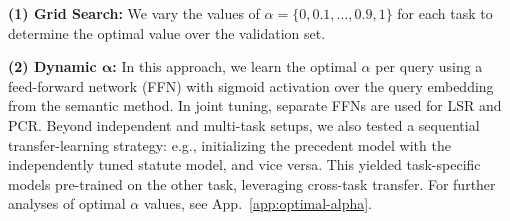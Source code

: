 \noindent\textbf{(1) Grid Search:} We vary the values of $\alpha = \{0, 0.1, \ldots, 0.9, 1\}$ for each task to determine the optimal value over the validation set. %

\noindent\textbf{(2) Dynamic $\mathbf{\alpha}$:} 
In this approach, we learn the optimal $\alpha$ per query using a feed-forward network (FFN) with sigmoid activation over the query embedding from the semantic method. In joint tuning, separate FFNs are used for LSR and PCR. Beyond independent and multi-task setups, we also tested a sequential transfer-learning strategy: e.g., initializing the precedent model with the independently tuned statute model, and vice versa. This yielded task-specific models pre-trained on the other task, leveraging cross-task transfer. For further analyses of optimal $\alpha$ values, see App.~\ref{app:optimal-alpha}.

